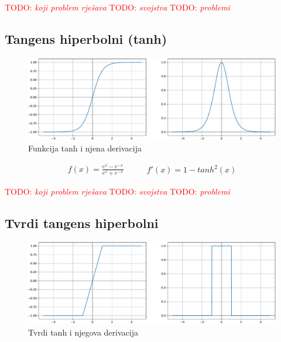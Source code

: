 \documentclass[times, utf8, numeric, diplomski]{fer}
\def\TODO#1{\noindent\textcolor{red}{TODO: \textit{#1}}\newline}
\def\todo#1{\TODO{#1}}
\begin{document}
\todo{koji problem rješava}
\todo{svojstva}
\todo{problemi}

\subsection{Tangens hiperbolni (tanh)}
\label{func:tanh}

\begin{figure}[H]
\includegraphics[width=\textwidth]{tanh.pdf}
\centering
\caption{Funkcija tanh i njena derivacija}
\label{fig:tanh}
\end{figure}

\begin{equation}
\label{eq:tanh}
\begin{split}
f(x) = \frac{e^x - e^{-x}}{e^x + e^{-x}}
\end{split}
\qquad
\begin{split}
f'(x) = 1 - tanh^2(x)
\end{split}
\end{equation}

\todo{koji problem rješava}
\todo{svojstva}
\todo{problemi}

\subsection{Tvrdi tangens hiperbolni}

\begin{figure}[H]
\includegraphics[width=\textwidth]{Hard_tanh.pdf}
\centering
\caption{Tvrdi tanh i njegova derivacija}
\label{fig:hard_tanh}
\end{figure}
\end{document}
